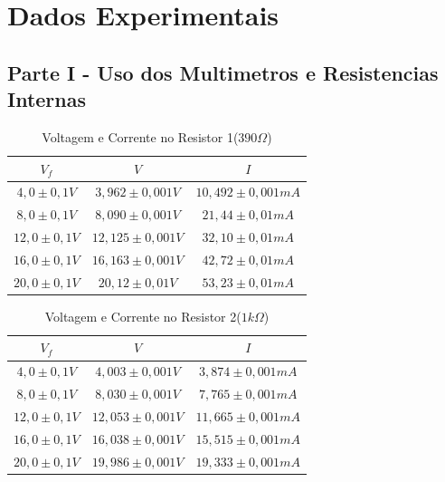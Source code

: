\documentclass[article]{abntex2}
\begin{document}
\section{Dados Experimentais}
\subsection{Parte I - Uso dos Multimetros e Resistencias Internas}
\begin{table}[htb]
\begin{center}
\caption{Voltagem e Corrente no Resistor 1($390\Omega$)}
\begin{tabular}{ |c|c|c| }
    \hline
    $V_f$ &$V$ &$I$ \\
    \hline
    $4,0 \pm 0,1V$ &$3,962 \pm 0,001V$ &$10,492 \pm 0,001mA$ \\
    \hline
    $8,0 \pm 0,1V$ &$8,090 \pm 0,001V$ &$21,44 \pm 0,01mA$ \\
    \hline
    $12,0 \pm 0,1V$ &$12,125 \pm 0,001V$ &$32,10 \pm 0,01mA$ \\
    \hline
    $16,0 \pm 0,1V$ &$16,163 \pm 0,001V$ &$42,72 \pm 0,01mA$ \\
    \hline
    $20,0 \pm 0,1V$ &$20,12 \pm 0,01V$ &$53,23 \pm 0,01mA$ \\
    \hline
\end{tabular}
\end{center}
\end{table}
\begin{table}[htb]
\begin{center}
\caption{Voltagem e Corrente no Resistor 2($1k\Omega$)}
\begin{tabular}{ |c|c|c| }
        \hline
        $V_f$ &$V$ &$I$ \\
        \hline
        $4,0 \pm 0,1V$ &$4,003 \pm 0,001V$ &$3,874 \pm 0,001mA$ \\
        \hline
        $8,0 \pm 0,1V$ &$8,030 \pm 0,001V$ &$7,765 \pm 0,001mA$ \\
        \hline
        $12,0 \pm 0,1V$ &$12,053 \pm 0,001V$ &$11,665 \pm 0,001mA$ \\
        \hline
        $16,0 \pm 0,1V$ &$16,038 \pm 0,001V$ &$15,515\pm 0,001mA$ \\
        \hline
        $20,0 \pm 0,1V$ &$19,986 \pm 0,001V$ &$19,333 \pm 0,001mA$ \\
        \hline
\end{tabular}
\end{center}
\end{table}
\end{document}
